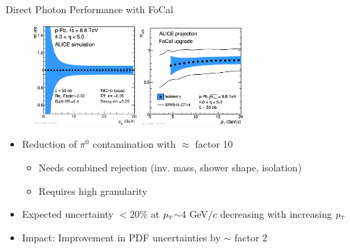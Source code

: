 \documentclass[aspectratio=169,10pt]{beamer}
\newcommand{\pT}          {\ensuremath{p_{\mbox{\tiny T}}}}
\begin{document}
  
  \begin{frame}{Direct Photon Performance with FoCal}
    \vspace{-0.3cm}
    \begin{figure}
      \centering
      \includegraphics[width=0.35\textwidth]{OakridgeTalk/2018-09-26-gamma_unc_INCnlo_sqrts88_4eta5.eps}\hspace{1cm}
      \includegraphics[width=0.35\textwidth]{OakridgeTalk/2018-11-23-2018-11-23-dir_gamma_unc_8TeV8_RpPb_wEPPS16.eps}
    \end{figure}
    \vspace{-0.3cm}
    \begin{itemize}
     \item Reduction of $\pi^0$ contamination with $\approx$ factor 10
           \begin{itemize}
            \item Needs combined rejection (inv. mass, shower shape, isolation)
            \item Requires high granularity
           \end{itemize}
      \item Expected uncertainty $< 20\%$ at \pT $\sim 4$ GeV/$c$  decreasing with increasing \pT
      \item Impact: Improvement in PDF uncertainties by $\sim$ factor 2
    \end{itemize}
  \end{frame}
\end{document}
